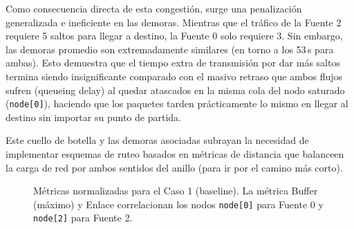\documentclass[10pt,letterpaper,twocolumn]{article}
\newcommand{\coltablesetup}{%
  \scriptsize
  \setlength{\tabcolsep}{3pt}%
  \renewcommand{\arraystretch}{1.08}%
}
\begin{document}
Como consecuencia directa de esta congestión, surge una penalización generalizada e ineficiente en las demoras. Mientras que el tráfico de la Fuente 2 requiere 5 saltos para llegar a destino, la Fuente 0 solo requiere 3. Sin embargo, las demoras promedio son extremadamente similares (en torno a los 53\,s para ambas). Esto demuestra que el tiempo extra de transmisión por dar más saltos termina siendo insignificante comparado con el masivo retraso que ambos flujos sufren (queueing delay) al quedar atascados en la misma cola del nodo saturado (\texttt{node[0]}), haciendo que los paquetes tarden prácticamente lo mismo en llegar al destino sin importar su punto de partida.

Este cuello de botella y las demoras asociadas subrayan la necesidad de implementar esquemas de ruteo basados en métricas de distancia que balanceen la carga de red por ambos sentidos del anillo (para ir por el camino más corto).


\begin{table}[!ht]
  \centering
  \caption{Resultados globales del Caso~1 (baseline).}
  \label{tab:caso1}
  \coltablesetup
\end{table}

\begin{figure}[!t]
  \centering
  \caption{Métricas normalizadas para el Caso 1 (baseline). La métrica Buffer (máximo) y Enlace correlacionan los nodos \texttt{node[0]} para Fuente 0 y \texttt{node[2]} para Fuente 2.}
  \label{fig:caso1-demora}
\end{figure}
\end{document}
